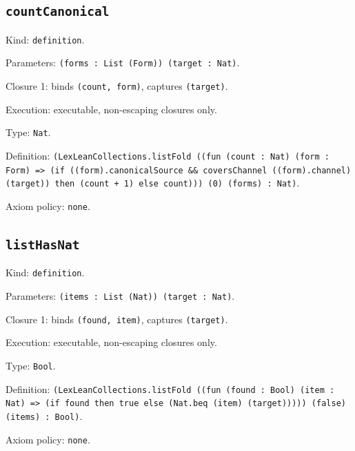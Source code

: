 \documentclass[11pt]{article}
\begin{document}
\subsection*{\texttt{countCanonical}}
\noindent Kind: \texttt{definition}.\par
\noindent Parameters: \texttt{(forms : List (Form)) (target : Nat)}.\par
\noindent Closure 1: binds \texttt{(count, form)}, captures \texttt{(target)}.\par
\noindent Execution: executable, non-escaping closures only.\par
\noindent Type: \texttt{Nat}.\par
\noindent Definition: \texttt{(LexLeanCollections.listFold ((fun (count : Nat) (form : Form) => (if ((form).canonicalSource \&\& coversChannel ((form).channel) (target)) then (count + 1) else count))) (0) (forms) : Nat)}.\par
\noindent Axiom policy: \texttt{none}.\par
\subsection*{\texttt{listHasNat}}
\noindent Kind: \texttt{definition}.\par
\noindent Parameters: \texttt{(items : List (Nat)) (target : Nat)}.\par
\noindent Closure 1: binds \texttt{(found, item)}, captures \texttt{(target)}.\par
\noindent Execution: executable, non-escaping closures only.\par
\noindent Type: \texttt{Bool}.\par
\noindent Definition: \texttt{(LexLeanCollections.listFold ((fun (found : Bool) (item : Nat) => (if found then true else (Nat.beq (item) (target))))) (false) (items) : Bool)}.\par
\noindent Axiom policy: \texttt{none}.\par
\end{document}
